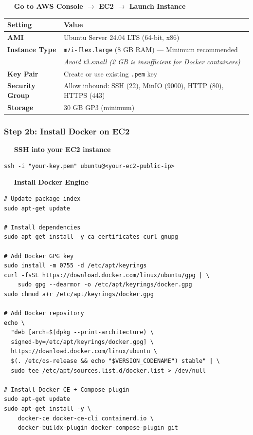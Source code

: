 \documentclass[12pt,a4paper]{article}
\newcounter{stepnum}
\newcommand{\step}[1]{%
  \stepcounter{stepnum}%
  \vspace{8pt}%
  \noindent\colorbox{setupCyan}{\color{white}\bfseries\small\ \thestepnum\ }%
  \hspace{4pt}\textbf{#1}%
  \par\vspace{2pt}%
}
\begin{document}
\setcounter{stepnum}{0}

\step{Go to AWS Console $\rightarrow$ EC2 $\rightarrow$ Launch Instance}

\begin{center}
\begin{tabularx}{\linewidth}{>{\bfseries}lX}
\toprule
Setting & Value \\
\midrule
AMI            & Ubuntu Server 24.04 LTS (64-bit, x86) \\
Instance Type  & \texttt{m7i-flex.large} (8 GB RAM) — Minimum recommended \\
               & \emph{Avoid t3.small (2 GB is insufficient for Docker containers)} \\
Key Pair       & Create or use existing \texttt{.pem} key \\
Security Group & Allow inbound: SSH (22), MinIO (9000), HTTP (80), HTTPS (443) \\
Storage        & 30 GB GP3 (minimum) \\
\bottomrule
\end{tabularx}
\end{center}

\subsubsection{Step 2b: Install Docker on EC2}

\step{SSH into your EC2 instance}
\begin{lstlisting}[style=terminal]
ssh -i "your-key.pem" ubuntu@<your-ec2-public-ip>
\end{lstlisting}

\step{Install Docker Engine}
\begin{lstlisting}[style=terminal]
# Update package index
sudo apt-get update

# Install dependencies
sudo apt-get install -y ca-certificates curl gnupg

# Add Docker GPG key
sudo install -m 0755 -d /etc/apt/keyrings
curl -fsSL https://download.docker.com/linux/ubuntu/gpg | \
    sudo gpg --dearmor -o /etc/apt/keyrings/docker.gpg
sudo chmod a+r /etc/apt/keyrings/docker.gpg

# Add Docker repository
echo \
  "deb [arch=$(dpkg --print-architecture) \
  signed-by=/etc/apt/keyrings/docker.gpg] \
  https://download.docker.com/linux/ubuntu \
  $(. /etc/os-release && echo "$VERSION_CODENAME") stable" | \
  sudo tee /etc/apt/sources.list.d/docker.list > /dev/null

# Install Docker CE + Compose plugin
sudo apt-get update
sudo apt-get install -y \
    docker-ce docker-ce-cli containerd.io \
    docker-buildx-plugin docker-compose-plugin git
\end{lstlisting}
\end{document}
